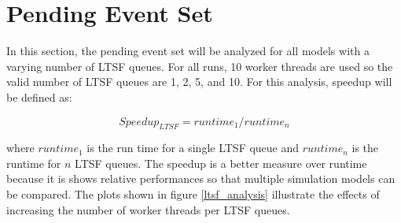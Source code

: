 \documentclass[11pt]{book}
\begin{document}
\section{Pending Event Set}

In this section, the pending event set will be analyzed for all models with a varying number of
LTSF queues. For all runs, 10 worker threads are used so the valid number of LTSF queues are
1, 2, 5, and 10. For this analysis, speedup will be defined as:

$$ Speedup_{LTSF} = runtime_{1}/runtime_{n} $$

\noindent
where $runtime_{1}$ is the run time for a single LTSF queue and $runtime_{n}$ is the runtime
for $n$ LTSF queues. The speedup is a better measure over runtime because it is shows relative
performances so that multiple simulation models can be compared. The plots shown in figure
\ref{ltsf_analysis} illustrate the effects of increasing the number of worker threads per LTSF
queues.
\end{document}
